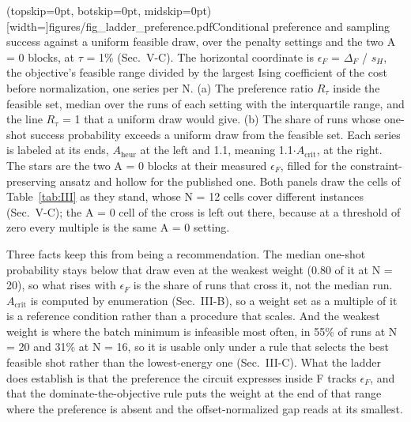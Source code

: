 \documentclass{ieeeaccess}
\begin{document}
\Figure[!t](topskip=0pt, botskip=0pt, midskip=0pt)[width=\textwidth]{figures/fig_ladder_preference.pdf}{Conditional preference and sampling success against a uniform feasible draw, over the penalty settings and the two A = 0 blocks, at $\tau$ = 1\% (Sec.~V-C). The horizontal coordinate is $\epsilon_{F}$ = $\Delta_{F}$ / $s_{H}$, the objective's feasible range divided by the largest Ising coefficient of the cost before normalization, one series per N. (a) The preference ratio $R_{\tau}$ inside the feasible set, median over the runs of each setting with the interquartile range, and the line $R_{\tau}$ = 1 that a uniform draw would give. (b) The share of runs whose one-shot success probability exceeds a uniform draw from the feasible set. Each series is labeled at its ends, $A_{\mathrm{heur}}$ at the left and 1.1, meaning 1.1$\cdot$$A_{\mathrm{crit}}$, at the right. The stars are the two A = 0 blocks at their measured $\epsilon_{F}$, filled for the constraint-preserving ansatz and hollow for the published one. Both panels draw the cells of Table~\ref{tab:III} as they stand, whose N = 12 cells cover different instances (Sec.~V-C); the A = 0 cell of the cross is left out there, because at a threshold of zero every multiple is the same A = 0 setting.\label{fig:2}}



Three facts keep this from being a recommendation. The median one-shot probability stays below that draw even at the weakest weight (0.80 of it at N = 20), so what rises with $\epsilon_{F}$ is the share of runs that cross it, not the median run. $A_{\mathrm{crit}}$ is computed by enumeration (Sec.~III-B), so a weight set as a multiple of it is a reference condition rather than a procedure that scales. And the weakest weight is where the batch minimum is infeasible most often, in 55\% of runs at N = 20 and 31\% at N = 16, so it is usable only under a rule that selects the best feasible shot rather than the lowest-energy one (Sec.~III-C). What the ladder does establish is that the preference the circuit expresses inside F tracks $\epsilon_{F}$, and that the dominate-the-objective rule puts the weight at the end of that range where the preference is absent and the offset-normalized gap reads at its smallest.
\end{document}
